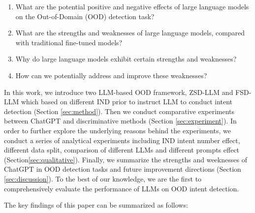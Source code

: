 \documentclass[10pt, a4paper]{article}
\begin{document}
\begin{enumerate}
[itemsep=4pt,topsep=0pt,parsep=0pt,leftmargin=9pt]
\item What are the potential positive and negative effects of large language models on the Out-of-Domain (OOD) detection task?%

\item What are the strengths and weaknesses of large language models, compared with traditional fine-tuned models?

\item Why do large language models exhibit certain strengths and weaknesses?%

\item How can we potentially address and improve these weaknesses?%
\end{enumerate}

In this work, we introduce two LLM-based OOD framework, ZSD-LLM and FSD-LLM which based on different IND prior to instruct LLM to conduct intent detection (Section \ref{sec:method}). Then we conduct comparative experiments between ChatGPT and discriminative methods (Section \ref{sec:experiment}). In order to further explore the underlying reasons behind the experiments, we conduct a series of analytical experiments including IND intent number effect, different data split, comparison of different LLMs and different prompts effect (Section\ref{sec:qualitative}). Finally, we summarize the strengths and weeknesses of ChatGPT in OOD detection tasks and future improvement directions (Section \ref{sec:discussion}). To the best of our knowledge, we are the first to comprehensively evaluate the performance of LLMs on OOD intent detection. 

The key findings of this paper can be summarized as follows:
\end{document}
